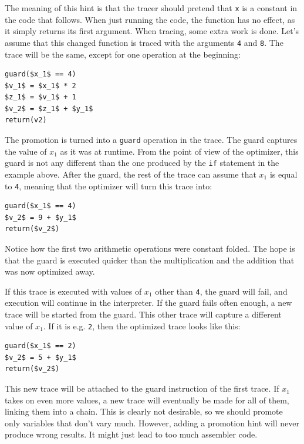 \documentclass{sigplanconf}
\begin{document}
The meaning of this hint is that the tracer should pretend that \texttt{x} is a
constant
in the code that follows. When just running the code, the function has no
effect, as it simply returns its first argument. When tracing, some extra work
is done. Let's assume that this changed function is traced with
the arguments \texttt{4} and \texttt{8}. The trace will be the same, except for one
operation at the beginning:

\begin{lstlisting}[mathescape,basicstyle=\ttfamily]
guard($x_1$ == 4)
$v_1$ = $x_1$ * 2
$z_1$ = $v_1$ + 1
$v_2$ = $z_1$ + $y_1$
return(v2)
\end{lstlisting}

The promotion is turned into a \texttt{guard} operation in the trace. The guard
captures the value of $x_1$ as it was at runtime. From the point of view of the
optimizer, this guard is not any different than the one produced by the \texttt{if}
statement in the example above. After the guard, the rest of the trace can
assume that $x_1$ is equal to \texttt{4}, meaning that the optimizer will turn this
trace into:

\begin{lstlisting}[mathescape,basicstyle=\ttfamily]
guard($x_1$ == 4)
$v_2$ = 9 + $y_1$
return($v_2$)
\end{lstlisting}

Notice how the first two arithmetic operations were constant folded. The hope is
that the guard is executed quicker than the multiplication and the addition that
was now optimized away.

If this trace is executed with values of $x_1$ other than \texttt{4}, the guard will
fail, and execution will continue in the interpreter. If the guard fails often
enough, a new trace will be started from the guard. This other trace will
capture a different value of $x_1$. If it is e.g. \texttt{2}, then the optimized
trace looks like this:

\begin{lstlisting}[mathescape,basicstyle=\ttfamily]
guard($x_1$ == 2)
$v_2$ = 5 + $y_1$
return($v_2$)
\end{lstlisting}

This new trace will be attached to the guard instruction of the first trace. If
$x_1$ takes on even more values, a new trace will eventually be made for all of them,
linking them into a chain. This is clearly not desirable, so we should promote
only variables that don't vary much. However, adding a promotion hint will never produce wrong
results. It might just lead to too much assembler code.
\end{document}
